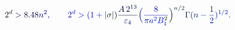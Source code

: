 \documentclass[12pt]{article}
\begin{document}
\makeatletter
\renewcommand*{\@textcolor}[3]{%
  \protect\leavevmode
  \begingroup
    \color#1{#2}#3%
  \endgroup
}
\makeatother
\begin{displaymath}
\mathcolor[RGB]{0,0,15}{2} ^ { \mathcolor[RGB]{0,0,30}{d} } \mathcolor[RGB]{0,0,45}{>} \mathcolor[RGB]{0,0,60}{8} \mathcolor[RGB]{0,0,75}{.} \mathcolor[RGB]{0,0,90}{4} \mathcolor[RGB]{0,0,105}{8} \mathcolor[RGB]{0,0,120}{n} ^ { \mathcolor[RGB]{0,0,135}{2} } \mathcolor[RGB]{0,0,150}{,} \qquad \mathcolor[RGB]{0,0,165}{2} ^ { \mathcolor[RGB]{0,0,180}{d} } \mathcolor[RGB]{0,0,195}{>} \mathcolor[RGB]{0,0,210}{(} \mathcolor[RGB]{0,0,225}{1} \mathcolor[RGB]{0,0,240}{+} \mathcolor[RGB]{0,0,255}{|} \mathcolor[RGB]{0,15,0}{\sigma} \mathcolor[RGB]{0,15,15}{|} \mathcolor[RGB]{0,15,30}{)} \mathcolor[RGB]{0,15,45}{\frac { \mathcolor[RGB]{0,15,60}{A} \, \mathcolor[RGB]{0,15,75}{2} ^ { \mathcolor[RGB]{0,15,90}{1} \mathcolor[RGB]{0,15,105}{3} } } { \mathcolor[RGB]{0,15,120}{\varepsilon} _ { \mathcolor[RGB]{0,15,135}{4} } } } \mathcolor[RGB]{0,15,150}{\Bigl(} \mathcolor[RGB]{0,15,165}{\frac { \mathcolor[RGB]{0,15,180}{8} } { \mathcolor[RGB]{0,15,195}{\pi} \mathcolor[RGB]{0,15,210}{a} ^ { \mathcolor[RGB]{0,15,225}{2} } \mathcolor[RGB]{0,15,240}{B} _ { \mathcolor[RGB]{0,15,255}{1} } ^ { \mathcolor[RGB]{0,30,0}{2} } } } \mathcolor[RGB]{0,30,15}{\Bigr)} ^ { \mathcolor[RGB]{0,30,30}{n} \mathcolor[RGB]{0,30,45}{/} \mathcolor[RGB]{0,30,60}{2} } \mathcolor[RGB]{0,30,75}{\Gamma} \mathcolor[RGB]{0,30,90}{(} \mathcolor[RGB]{0,30,105}{n} \mathcolor[RGB]{0,30,120}{-} \mathcolor[RGB]{0,30,135}{\frac { \mathcolor[RGB]{0,30,150}{1} } { \mathcolor[RGB]{0,30,165}{2} } } \mathcolor[RGB]{0,30,180}{)} ^ { \mathcolor[RGB]{0,30,195}{1} \mathcolor[RGB]{0,30,210}{/} \mathcolor[RGB]{0,30,225}{2} } \mathcolor[RGB]{0,30,240}{.}
\end{displaymath}
\end{document}
